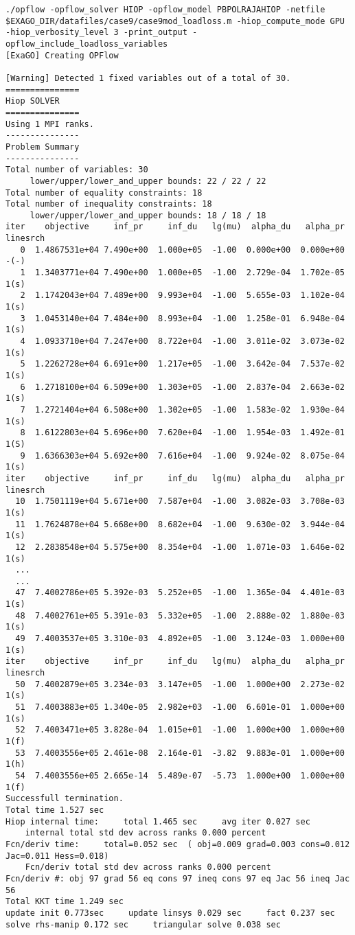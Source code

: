 \begin{lstlisting}
./opflow -opflow_solver HIOP -opflow_model PBPOLRAJAHIOP -netfile $EXAGO_DIR/datafiles/case9/case9mod_loadloss.m -hiop_compute_mode GPU -hiop_verbosity_level 3 -print_output -opflow_include_loadloss_variables
[ExaGO] Creating OPFlow

[Warning] Detected 1 fixed variables out of a total of 30.
===============
Hiop SOLVER
===============
Using 1 MPI ranks.
---------------
Problem Summary
---------------
Total number of variables: 30
     lower/upper/lower_and_upper bounds: 22 / 22 / 22
Total number of equality constraints: 18
Total number of inequality constraints: 18
     lower/upper/lower_and_upper bounds: 18 / 18 / 18
iter    objective     inf_pr     inf_du   lg(mu)  alpha_du   alpha_pr linesrch
   0  1.4867531e+04 7.490e+00  1.000e+05  -1.00  0.000e+00  0.000e+00  -(-)
   1  1.3403771e+04 7.490e+00  1.000e+05  -1.00  2.729e-04  1.702e-05  1(s)
   2  1.1742043e+04 7.489e+00  9.993e+04  -1.00  5.655e-03  1.102e-04  1(s)
   3  1.0453140e+04 7.484e+00  8.993e+04  -1.00  1.258e-01  6.948e-04  1(s)
   4  1.0933710e+04 7.247e+00  8.722e+04  -1.00  3.011e-02  3.073e-02  1(s)
   5  1.2262728e+04 6.691e+00  1.217e+05  -1.00  3.642e-04  7.537e-02  1(s)
   6  1.2718100e+04 6.509e+00  1.303e+05  -1.00  2.837e-04  2.663e-02  1(s)
   7  1.2721404e+04 6.508e+00  1.302e+05  -1.00  1.583e-02  1.930e-04  1(s)
   8  1.6122803e+04 5.696e+00  7.620e+04  -1.00  1.954e-03  1.492e-01  1(S)
   9  1.6366303e+04 5.692e+00  7.616e+04  -1.00  9.924e-02  8.075e-04  1(s)
iter    objective     inf_pr     inf_du   lg(mu)  alpha_du   alpha_pr linesrch
  10  1.7501119e+04 5.671e+00  7.587e+04  -1.00  3.082e-03  3.708e-03  1(s)
  11  1.7624878e+04 5.668e+00  8.682e+04  -1.00  9.630e-02  3.944e-04  1(s)
  12  2.2838548e+04 5.575e+00  8.354e+04  -1.00  1.071e-03  1.646e-02  1(s)
  ...
  ...
  47  7.4002786e+05 5.392e-03  5.252e+05  -1.00  1.365e-04  4.401e-03  1(s)
  48  7.4002761e+05 5.391e-03  5.332e+05  -1.00  2.888e-02  1.880e-03  1(s)
  49  7.4003537e+05 3.310e-03  4.892e+05  -1.00  3.124e-03  1.000e+00  1(s)
iter    objective     inf_pr     inf_du   lg(mu)  alpha_du   alpha_pr linesrch
  50  7.4002879e+05 3.234e-03  3.147e+05  -1.00  1.000e+00  2.273e-02  1(s)
  51  7.4003883e+05 1.340e-05  2.982e+03  -1.00  6.601e-01  1.000e+00  1(s)
  52  7.4003471e+05 3.828e-04  1.015e+01  -1.00  1.000e+00  1.000e+00  1(f)
  53  7.4003556e+05 2.461e-08  2.164e-01  -3.82  9.883e-01  1.000e+00  1(h)
  54  7.4003556e+05 2.665e-14  5.489e-07  -5.73  1.000e+00  1.000e+00  1(f)
Successfull termination.
Total time 1.527 sec 
Hiop internal time:     total 1.465 sec     avg iter 0.027 sec 
    internal total std dev across ranks 0.000 percent
Fcn/deriv time:     total=0.052 sec  ( obj=0.009 grad=0.003 cons=0.012 Jac=0.011 Hess=0.018) 
    Fcn/deriv total std dev across ranks 0.000 percent
Fcn/deriv #: obj 97 grad 56 eq cons 97 ineq cons 97 eq Jac 56 ineq Jac 56
Total KKT time 1.249 sec 
update init 0.773sec     update linsys 0.029 sec     fact 0.237 sec 
solve rhs-manip 0.172 sec     triangular solve 0.038 sec 


\end{lstlisting}

